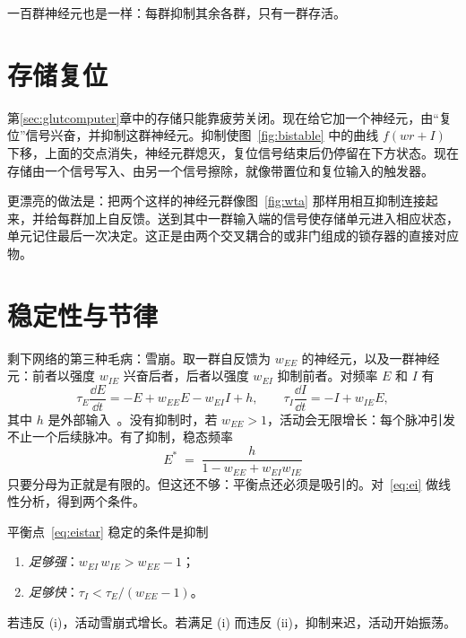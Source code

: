 一百群神经元也是一样：每群抑制其余各群，只有一群存活。

\section{存储复位}

第\ref{sec:glutcomputer}章中的存储只能靠疲劳关闭。现在给它加一个神经元，由“复位”信号兴奋，并抑制这群神经元。抑制使图~\ref{fig:bistable} 中的曲线 $f(wr+I)$ 下移，上面的交点消失，神经元群熄灭，复位信号结束后仍停留在下方状态。现在存储由一个信号写入、由另一个信号擦除，就像带置位和复位输入的触发器。

更漂亮的做法是：把两个这样的神经元群像图~\ref{fig:wta} 那样用相互抑制连接起来，并给每群加上自反馈。送到其中一群输入端的信号使存储单元进入相应状态，单元记住最后一次决定。这正是由两个交叉耦合的或非门组成的锁存器的直接对应物。

\section{稳定性与节律}

剩下网络的第三种毛病：雪崩。取一群自反馈为 $w_{EE}$ 的神经元，以及一群神经元：前者以强度 $w_{IE}$ 兴奋后者，后者以强度 $w_{EI}$ 抑制前者。对频率 $E$ 和 $I$ 有
\begin{equation}
\tau_E\frac{\dd E}{\dd t} = -E + w_{EE}E - w_{EI}I + h, \qquad
\tau_I\frac{\dd I}{\dd t} = -I + w_{IE}E ,
\label{eq:ei}
\end{equation}
其中 $h$ 是外部输入~\cite{WilsonCowan1972}。没有抑制时，若 $w_{EE}>1$，活动会无限增长：每个脉冲引发不止一个后续脉冲。有了抑制，稳态频率
\begin{equation}
E^* \;=\; \frac{h}{1-w_{EE}+w_{EI}w_{IE}}
\label{eq:eistar}
\end{equation}
只要分母为正就是有限的。但这还不够：平衡点还必须是吸引的。对~\eqref{eq:ei} 做线性分析，得到两个条件。

\begin{keyblock}
\begin{proposition}[稳定性条件]
\label{prop:ei}
平衡点~\eqref{eq:eistar} 稳定的条件是抑制
\begin{enumerate}
\item[(i)] \emph{足够强}：$w_{EI}\,w_{IE} > w_{EE}-1$；
\item[(ii)] \emph{足够快}：$\tau_I < \tau_E/(w_{EE}-1)$。
\end{enumerate}
若违反 (i)，活动雪崩式增长。若满足 (i) 而违反 (ii)，抑制来迟，活动开始振荡。
\end{proposition}
\end{keyblock}

